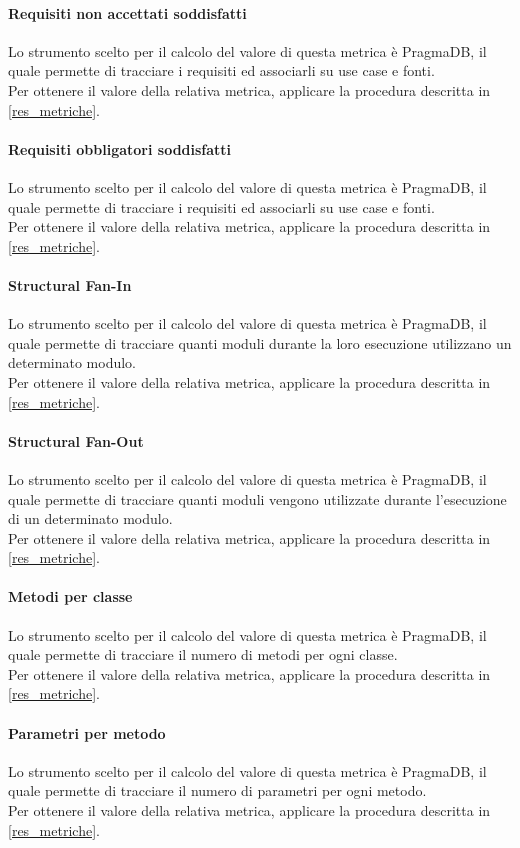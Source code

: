 \paragraph{Requisiti non accettati soddisfatti}
Lo strumento scelto per il calcolo del valore di questa metrica è PragmaDB, il quale permette di tracciare i requisiti ed associarli su use case e fonti.\\
Per ottenere il valore della relativa metrica, applicare la procedura descritta in \ref{res_metriche}.
\paragraph{Requisiti obbligatori soddisfatti}
Lo strumento scelto per il calcolo del valore di questa metrica è PragmaDB, il quale permette di tracciare i requisiti ed associarli su use case e fonti.\\
Per ottenere il valore della relativa metrica, applicare la procedura descritta in \ref{res_metriche}.
\paragraph{Structural Fan-In}
Lo strumento scelto per il calcolo del valore di questa metrica è PragmaDB, il quale permette di tracciare quanti moduli durante la loro esecuzione utilizzano un determinato modulo.\\
Per ottenere il valore della relativa metrica, applicare la procedura descritta in \ref{res_metriche}.
\paragraph{Structural Fan-Out}
Lo strumento scelto per il calcolo del valore di questa metrica è PragmaDB, il quale permette di tracciare quanti moduli vengono utilizzate durante l'esecuzione di un determinato modulo.\\
Per ottenere il valore della relativa metrica, applicare la procedura descritta in \ref{res_metriche}.
\paragraph{Metodi per classe}
Lo strumento scelto per il calcolo del valore di questa metrica è PragmaDB, il quale permette di tracciare il numero di metodi per ogni classe.\\
Per ottenere il valore della relativa metrica, applicare la procedura descritta in \ref{res_metriche}.
\paragraph{Parametri per metodo}
Lo strumento scelto per il calcolo del valore di questa metrica è PragmaDB, il quale permette di tracciare il numero di parametri per ogni metodo.\\
Per ottenere il valore della relativa metrica, applicare la procedura descritta in \ref{res_metriche}.
